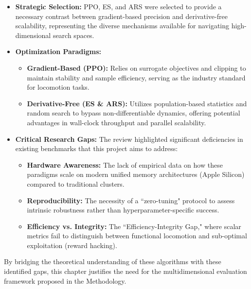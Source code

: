 \begin{itemize}
    \item \textbf{Strategic Selection:} PPO, ES, and ARS were selected to provide a necessary contrast between gradient-based precision and derivative-free scalability, representing the diverse mechanisms available for navigating high-dimensional search spaces.
    
    \item \textbf{Optimization Paradigms:} 
    \begin{itemize}
        \item \textbf{Gradient-Based (PPO):} Relies on surrogate objectives and clipping to maintain stability and sample efficiency, serving as the industry standard for locomotion tasks.
        \item \textbf{Derivative-Free (ES \& ARS):} Utilizes population-based statistics and random search to bypass non-differentiable dynamics, offering potential advantages in wall-clock throughput and parallel scalability.
    \end{itemize}

    \item \textbf{Critical Research Gaps:} The review highlighted significant deficiencies in existing benchmarks that this project aims to address:
    \begin{itemize}
        \item \textbf{Hardware Awareness:} The lack of empirical data on how these paradigms scale on modern unified memory architectures (Apple Silicon) compared to traditional clusters.
        \item \textbf{Reproducibility:} The necessity of a ``zero-tuning" protocol to assess intrinsic robustness rather than hyperparameter-specific success.
        \item \textbf{Efficiency vs. Integrity:} The ``Efficiency-Integrity Gap," where scalar metrics fail to distinguish between functional locomotion and sub-optimal exploitation (reward hacking).
    \end{itemize}
\end{itemize}

By bridging the theoretical understanding of these algorithms with these identified gaps, this chapter justifies the need for the multidimensional evaluation framework proposed in the Methodology.

\clearpage
\null %
\clearpage
